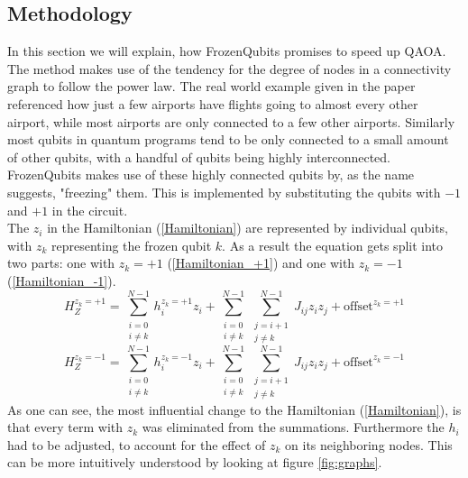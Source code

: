 \subsection{Methodology}\label{methodology}
In this section we will explain, how FrozenQubits promises to speed up QAOA. The method makes use of the tendency for the degree of nodes in a connectivity graph to follow the power law. The real world example given in the paper referenced how just a few airports have flights going to almost every other airport, while most airports are only connected to a few other airports. Similarly most qubits in quantum programs tend to be only connected to a small amount of other qubits, with a handful of qubits being highly interconnected. FrozenQubits makes use of these highly connected qubits by, as the name suggests, "freezing" them. This is implemented by substituting the qubits with $-1$ and $+1$ in the circuit. \\
The $z_i$ in the Hamiltonian (\ref{Hamiltonian}) are represented by individual qubits, with $z_k$ representing the frozen qubit $k$. As a result the equation gets split into two parts: one with $z_k=+1$ (\ref{Hamiltonian_+1}) and one with $z_k=-1$ (\ref{Hamiltonian_-1}).
\begin{equation}\label{Hamiltonian_+1}
    H_Z^{z_k=+1}=\sum_{\substack{i=0 \\ i \neq k}}^{N-1} h_i^{z_k=+1}z_i+\sum^{N-1}_{\substack{i=0 \\ i \neq k}}\sum^{N-1}_{\substack{j=i+1 \\ j \neq k}}J_{ij}z_iz_j+\text{offset}^{z_k=+1}
\end{equation}
\begin{equation}\label{Hamiltonian_-1}
    H_Z^{z_k=-1}=\sum_{\substack{i=0 \\ i \neq k}}^{N-1} h_i^{z_k=-1}z_i+\sum^{N-1}_{\substack{i=0 \\ i \neq k}}\sum^{N-1}_{\substack{j=i+1 \\ j \neq k}}J_{ij}z_iz_j+\text{offset}^{z_k=-1}
\end{equation}
As one can see, the most influential change to the Hamiltonian (\ref{Hamiltonian}), is that every term with $z_k$ was eliminated from the summations. Furthermore the $h_i$ had to be adjusted, to account for the effect of $z_k$ on its neighboring nodes. This can be more intuitively understood by looking at figure \ref{fig:graphs}.
